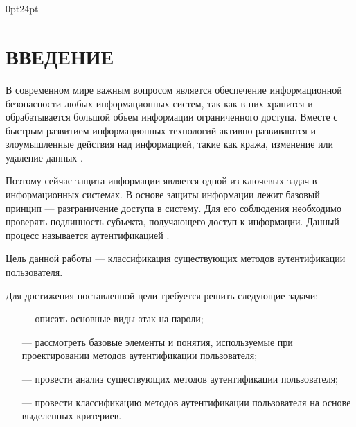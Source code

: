 \titlespacing\section{\parindent}{0pt}{24pt}
\section*{\hfill{\centering\normalsize ВВЕДЕНИЕ}\hfill}
В современном мире важным вопросом является обеспечение информационной безопасности любых информационных систем, так как в них хранится и обрабатывается большой объем информации ограниченного доступа. Вместе с быстрым развитием информационных технологий активно развиваются и злоумышленные действия над информацией, такие как кража, изменение или удаление данных \cite{bib1}.

Поэтому сейчас защита информации является одной из ключевых задач в информационных системах. В основе защиты информации лежит базовый принцип --- разграничение доступа в систему. Для его соблюдения необходимо проверять подлинность субъекта, получающего доступ к информации. Данный процесс называется аутентификацией \cite{bib2}.

Цель данной работы --- классификация существующих методов аутентификации пользователя.

Для достижения поставленной цели требуется решить следующие задачи:
\begin{itemize}
    \item [---] описать основные виды атак на пароли;
    \item [---] рассмотреть базовые элементы и понятия, используемые при проектировании методов аутентификации пользователя;
    \item [---] провести анализ существующих методов аутентификации пользователя;
    \item [---] провести классификацию методов аутентификации пользователя на основе выделенных критериев.
\end{itemize}
